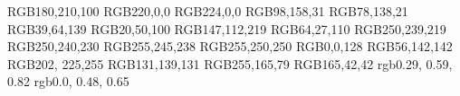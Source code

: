 \usepackage{amsmath}
\usepackage{amsfonts}
\usepackage{adjustbox}
\usepackage{amssymb}
\usepackage{bm}
\usepackage{lipsum}
\usepackage{setspace}
\usepackage{tabularx}
\usepackage{graphicx}
\usepackage{multirow}
\usepackage{fourier}
\usepackage{braket}
\usepackage{paralist}
\usepackage{tikz}
\usepackage{times}
\usepackage[margin=1in]{geometry}



\definecolor{lgreen} {RGB}{180,210,100}
\definecolor{lred}   {RGB}{220,0,0}
\definecolor{nred}   {RGB}{224,0,0}
\definecolor{ngreen} {RGB}{98,158,31}
\definecolor{dgreen} {RGB}{78,138,21}
\definecolor{royalblue}  {RGB}{39,64,139}
\definecolor{jblue}  {RGB}{20,50,100}
\definecolor{mpurple}  {RGB}{147,112,219}
\definecolor{dpurple}  {RGB}{64,27,110}
\definecolor{antiquewhite} {RGB}{250,239,219}
\definecolor{linen} {RGB}{250,240,230}
\definecolor{seashell} {RGB}{255,245,238}
\definecolor{snow} {RGB}{255,250,250}
\definecolor{navy} {RGB}{0,0,128}
\definecolor{sgiteal} {RGB}{56,142,142}
\definecolor{Lblue} {RGB}{202, 225,255}
\definecolor{honeydew} {RGB}{131,139,131}
\definecolor{tan}	{RGB}{255,165,79}
\definecolor{brown}	{RGB}{165,42,42}
\definecolor{celestialBlue} {rgb}{0.29, 0.59, 0.82}
\definecolor{cirulean} {rgb}{0.0, 0.48, 0.65}
